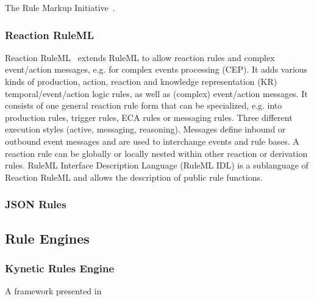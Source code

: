 \documentclass[11pt]{article}%
\begin{document}
The Rule Markup Initiative~\cite{wwwruleml}.


\subsubsection{Reaction RuleML}
Reaction RuleML~\cite{2012-Paschke_etal-ReactionRuleML.pdf} extends RuleML to allow reaction rules and complex event/action messages, e.g. for complex events processing (CEP). It adds various kinds of production, action, reaction and knowledge representation (KR) temporal/event/action logic rules, as well as (complex) event/action messages. It consists of one general reaction rule form that can be specialized, e.g. into production rules, trigger rules, ECA rules or messaging rules. Three different execution styles (active, messaging,  reasoning). Messages define inbound or outbound event messages and are used to interchange events and rule bases. A reaction rule can be globally or locally nested within other reaction or derivation rules.
RuleML Interface Description Language (RuleML IDL) is a sublanguage of Reaction RuleML and allows the description of public rule functions.


\subsubsection{JSON Rules}


\subsection{Rule Engines}

\subsubsection{Kynetic Rules Engine}
A framework presented in ~\cite{bookTheLiveWeb}
\end{document}
